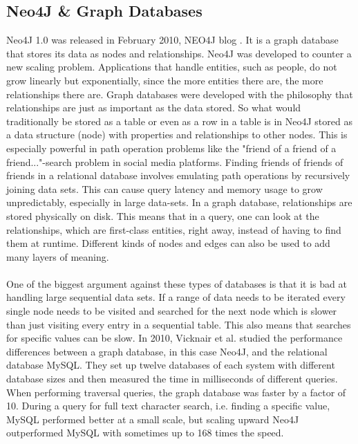 \documentclass{cslthse-msc}
\begin{document}
\subsection{Neo4J \& Graph Databases}
Neo4J 1.0 was released in February 2010, NEO4J blog \cite{Neo4J10}. It is a graph database that stores its data as nodes and relationships. Neo4J was developed to counter a new scaling problem. Applications that handle entities, such as people, do not grow linearly but exponentially, since the more entities there are, the more relationships there are. Graph databases were developed with the philosophy that relationships are just as important as the data stored. So what would traditionally be stored as a table or even as a row in a table is in Neo4J stored as a data structure (node) with properties and relationships to other nodes. This is especially powerful in path operation problems like the "friend of a friend of a friend..."-search problem in social media platforms. Finding friends of friends of friends in a relational database involves emulating path operations by recursively joining data sets. This can cause query latency and memory usage to grow unpredictably, especially in large data-sets. In a graph database, relationships are stored physically on disk. This means that in a query, one can look at the relationships, which are first-class entities, right away, instead of having to find them at runtime. Different kinds of nodes and edges can also be used to add many layers of meaning. \\\\
One of the biggest argument against these types of databases is that it is bad at handling large sequential data sets. If a range of data needs to be iterated every single node needs to be visited and searched for the next node which is slower than just visiting every entry in a sequential table. This also means that searches for specific values can be slow. In 2010, Vicknair et al. \cite{vicknair2010comparison} studied the performance differences between a graph database, in this case Neo4J, and the relational database MySQL. They set up twelve databases of each system with different database sizes and then measured the time in milliseconds of different queries. When performing traversal queries, the graph database was faster by a factor of 10. During a query for full text character search, i.e. finding a specific value, MySQL performed better at a small scale, but scaling upward Neo4J outperformed MySQL with sometimes up to 168 times the speed.
\end{document}
